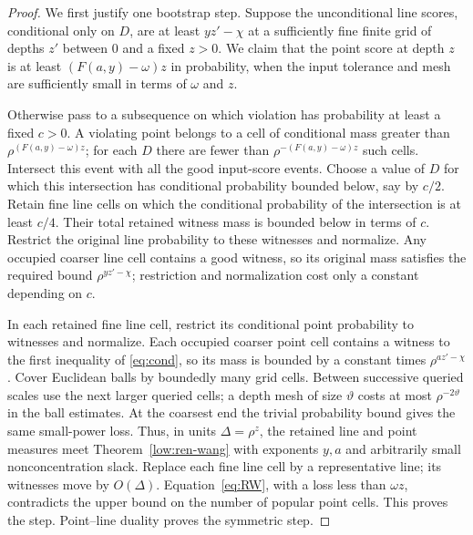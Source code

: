 \begin{proof}
We first justify one bootstrap step. Suppose the unconditional line
scores, conditional only on $D$, are at least $yz'-\chi$ at a sufficiently
fine finite grid of depths $z'$ between $0$ and a fixed $z>0$.
We claim that the point score at depth $z$ is at least
$(F(a,y)-\omega)z$ in probability, when the input tolerance and mesh are
sufficiently small in terms of $\omega$ and $z$.

Otherwise pass to a subsequence on which violation has probability at
least a fixed $c>0$. A violating point belongs to a cell of conditional
mass greater than $\rho^{(F(a,y)-\omega)z}$; for each $D$ there are fewer
than $\rho^{-(F(a,y)-\omega)z}$ such cells. Intersect this event with all
the good input-score events. Choose a value of $D$ for which this
intersection has conditional probability bounded below, say by $c/2$.
Retain fine line cells on which the conditional probability of the
intersection is at least $c/4$. Their total retained witness mass is
bounded below in terms of $c$. Restrict the original line probability
to these witnesses and normalize. Any occupied coarser line cell
contains a good witness, so its original mass satisfies the required
bound $\rho^{yz'-\chi}$; restriction and normalization cost only a
constant depending on $c$.

In each retained fine line cell, restrict its conditional point
probability to witnesses and normalize. Each occupied coarser point
cell contains a witness to the first inequality of \eqref{eq:cond},
so its mass is bounded by a constant times $\rho^{az'-\chi}$.
Cover Euclidean balls by boundedly many grid cells. Between successive
queried scales use the next larger queried cells; a depth mesh of size
$\vartheta$ costs at most $\rho^{-2\vartheta}$ in the ball estimates.
At the coarsest end the trivial probability bound gives the same
small-power loss. Thus, in units $\Delta=\rho^z$, the retained line
and point measures meet Theorem~\ref{low:ren-wang} with exponents $y,a$
and arbitrarily small nonconcentration slack. Replace each fine line
cell by a representative line; its witnesses move by $O(\Delta)$.
Equation~\eqref{eq:RW}, with a loss less than $\omega z$, contradicts
the upper bound on the number of popular point cells. This proves the
step. Point--line duality proves the symmetric step.


\end{proof}

